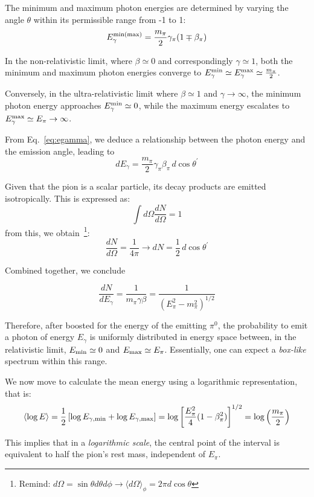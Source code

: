 The minimum and maximum photon energies are determined by varying the angle \(\theta\) within its permissible range from -1 to 1:
%
\[
E_{\gamma}^{\rm min(max)} = \frac{m_\pi}{2} \gamma_\pi (1 \mp \beta_\pi)
\]

In the non-relativistic limit, where \(\beta \simeq 0\) and correspondingly \(\gamma \simeq 1\), both the minimum and maximum photon energies converge to \( E_{\gamma}^{\rm min} \simeq E_{\gamma}^{\rm max} \simeq \frac{m_\pi}{2} \).

Conversely, in the ultra-relativistic limit where \(\beta \simeq 1\) and \(\gamma \rightarrow \infty\), the minimum photon energy approaches \( E_\gamma^{\rm min} \simeq 0 \), while the maximum energy escalates to \( E_\gamma^{\rm max} \simeq E_\pi \rightarrow \infty \).

From Eq.~\ref{eq:egamma}, we deduce a relationship between the photon energy and the emission angle, leading to
%
\[
dE_\gamma = \frac{m_\pi}{2} \gamma_\pi \beta_\pi \, d\!\cos\theta^\prime
\]

Given that the pion is a scalar particle, its decay products are emitted isotropically. This is expressed as:
%
\[
\int d\Omega \frac{dN}{d\Omega} = 1 
\]
%
from this, we obtain~\footnote{Remind: $d\Omega = \sin \theta d\theta d\phi \rightarrow \langle d\Omega \rangle_\phi = 2 \pi d\cos\theta$}:
%
\[
\frac{dN}{d\Omega} = \frac{1}{4\pi} \rightarrow dN = \frac{1}{2} \, d\!\cos\theta^\prime
\]

Combined together, we conclude
%
\begin{remark}
\[
\frac{dN}{dE_\gamma} = \frac{1}{m_\pi \gamma \beta} = \frac{1}{(E^2_\pi - m_\pi^2)^{1/2}}
\]
\end{remark}

Therefore, after boosted for the energy of the emitting $\pi^0$, the probability to emit a photon of energy $E_\gamma$  is uniformly distributed in energy space between, in the relativistic limit, \(E_{\rm min} \simeq 0\) and \(E_{\rm max} \simeq E_\pi\). Essentially, one can expect a \emph{box-like} spectrum within this range.

We now move to calculate the mean energy using a logarithmic representation, that is:
%
\[
\langle \log E \rangle 
= \frac{1}{2} \left[ \log E_{\rm \gamma, min} + \log E_{\rm \gamma, max} \right] 
= \log \left[ \frac{E_\pi^2}{4} (1-\beta_\pi^2) \right]^{1/2} = \log \left(\frac{m_\pi}{2}\right)
\]

This implies that in a \emph{logarithmic scale}, the central point of the interval is equivalent to half the pion's rest mass, independent of \(E_\pi\).


